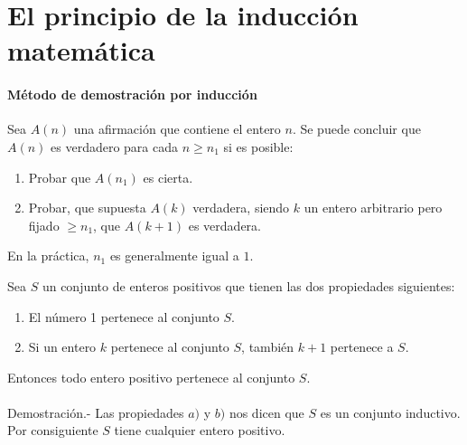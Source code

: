 \setcounter{chapter}{4}
\setcounter{section}{2}
\section{El principio de la inducción matemática}
\begin{tcolorbox}[colback=white]
\paragraph{Método de demostración por inducción}Sea $A(n)$ una afirmación que contiene el entero $n$. Se puede concluir que $A(n)$ es verdadero para cada $n\geq n_1$ si es posible:
\begin{enumerate}[\bfseries a)]
\item Probar que $A(n_1)$ es cierta.
\item Probar, que supuesta $A(k)$ verdadera, siendo $k$ un entero arbitrario pero fijado $\geq n_1$, que $A(k+1)$ es verdadera.\\
\end{enumerate}
En la práctica, $n_1$ es generalmente igual a $1$.
\end{tcolorbox}

\begin{teo}
Sea $S$ un conjunto de enteros positivos que tienen las dos propiedades siguientes:
\begin{enumerate}[\bfseries a)]
\item El número 1 pertenece al conjunto $S$.
\item Si un entero $k$ pertenece al conjunto $S$, también $k+1$ pertenece a $S$.
\end{enumerate}
Entonces todo entero positivo pertenece al conjunto $S$.\\\\
Demostración.- \; Las propiedades $a)$ y $b)$ nos dicen que $S$ es un conjunto inductivo. Por consiguiente $S$ tiene cualquier entero positivo.\\\\ 
\end{teo}

